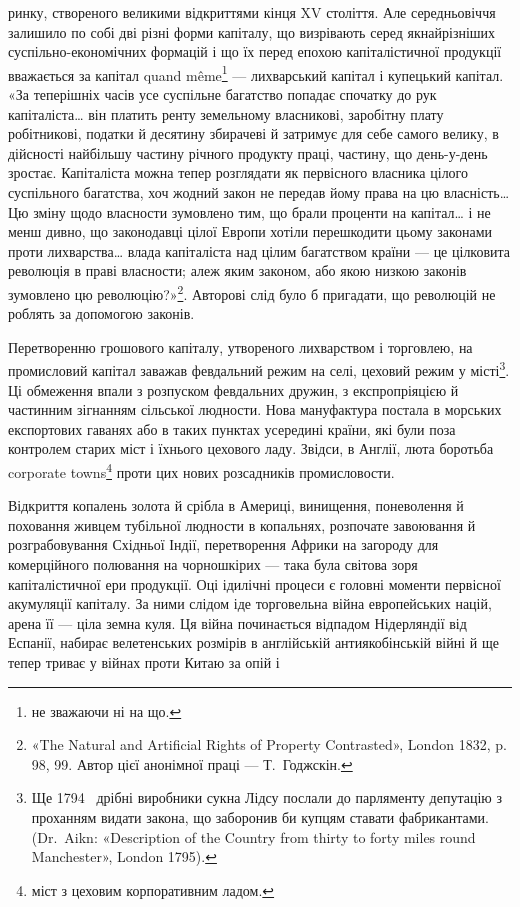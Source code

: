 \parcont{}  %
ринку, створеного великими відкриттями кінця XV століття.
Але середньовіччя залишило по собі дві різні форми капіталу,
що визрівають серед якнайрізніших суспільно-економічних
формацій і що їх перед епохою капіталістичної продукції вважається
за капітал quand même\footnote*{
не зважаючи ні на що. 
} — лихварський капітал і купецький
капітал. «За теперішніх часів усе суспільне багатство
попадає спочатку до рук капіталіста\dots{} він платить ренту земельному
власникові, заробітну плату робітникові, податки й десятину
збирачеві й затримує для себе самого велику, в дійсності
найбільшу частину річного продукту праці, частину, що день-у-день
зростає. Капіталіста можна тепер розглядати як первісного
власника цілого суспільного багатства, хоч жодний закон
не передав йому права на цю власність\dots{} Цю зміну щодо власности
зумовлено тим, що брали проценти на капітал\dots{} і не менш
дивно, що законодавці цілої Европи хотіли перешкодити цьому
законами проти лихварства\dots{} влада капіталіста над цілим багатством
країни — це цілковита революція в праві власности;
алеж яким законом, або якою низкою законів зумовлено цю
революцію?»\footnote{
«The Natural and Artificial Rights of Property Contrasted», London
1832, p. 98, 99. Автор цієї анонімної праці — Т.~Годжскін.
}. Авторові слід було б пригадати, що революцій
не роблять за допомогою законів.

Перетворенню грошового капіталу, утвореного лихварством
і торговлею, на промисловий капітал заважав февдальний режим
на селі, цеховий режим у місті\footnote{
Ще 1794~ дрібні виробники сукна Лідсу послали до парляменту
депутацію з проханням видати закона, що заборонив би купцям ставати
фабрикантами. (Dr.~Aikn: «Description of the Country from thirty to forty
miles round Manchester», London 1795).
}. Ці обмеження впали з розпуском
февдальних дружин, з експропріяцією й частинним зігнанням
сільської людности. Нова мануфактура постала в морських
експортових гаванях або в таких пунктах усередині
країни, які були поза контролем старих міст і їхнього цехового
ладу. Звідси, в Англії, люта боротьба corporate towns\footnote*{
міст з цеховим корпоративним ладом. 
} проти
цих нових розсадників промисловости.

Відкриття копалень золота й срібла в Америці, винищення,
поневолення й поховання живцем тубільної людности в копальнях,
розпочате завоювання й розграбовування Східньої Індії,
перетворення Африки на загороду для комерційного полювання
на чорношкірих — така була світова зоря капіталістичної ери
продукції. Оці ідилічні процеси є головні моменти первісної
акумуляції капіталу. За ними слідом іде торговельна війна европейських
націй, арена її — ціла земна куля. Ця війна починається
відпадом Нідерляндії від Еспанії, набирає велетенських розмірів
в англійській антиякобінській війні й ще тепер триває у війнах
проти Китаю за опій і~
